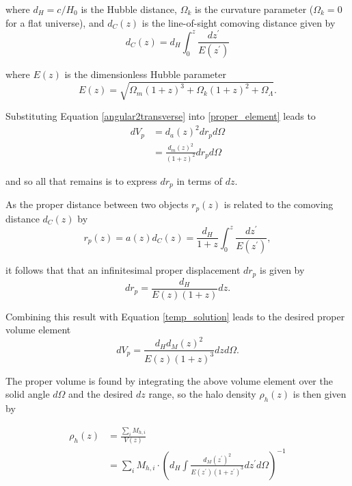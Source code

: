 \documentclass[%
 reprint,
 amsmath,amssymb,
 aps,nofootinbib
]{revtex4-1}
\begin{document}
\noindent where $d_H=c/H_0$ is the Hubble distance, $\Omega_k$ is the curvature parameter ($\Omega_k=0$ for a flat universe), and $d_C(z)$ is the line-of-sight comoving distance given by
\begin{equation}\label{comoving_distance}
d_C(z)=d_H\int_0^z\frac{dz^\prime}{E(z^\prime)}
\end{equation}

\noindent where $E(z)$ is the dimensionless Hubble parameter
\begin{equation}\label{dim_hubble_parameter}
E(z)=\sqrt{\Omega_m(1+z)^3+\Omega_k(1+z)^2+\Omega_\Lambda}.
\end{equation}

\noindent Substituting Equation \eqref{angular2transverse} into \eqref{proper_element} leads to
\begin{align}\label{temp_solution}
dV_p&=d_a(z)^2dr_pd\Omega\nonumber\\
&=\frac{d_m(z)^2}{(1+z)^2}dr_pd\Omega
\end{align}

\noindent and so all that remains is to express $dr_p$ in terms of $dz$.

As the proper distance between two objects $r_p(z)$ is related to the comoving distance $d_C(z)$ by
\begin{equation}\label{physical2comoving}
r_p(z)=a(z)d_C(z)=\frac{d_H}{1+z}\int_0^z\frac{dz^\prime}{E(z^\prime)},
\end{equation}

\noindent it follows that that an infinitesimal proper displacement $dr_p$ is given by
\begin{equation}\label{physical2comoving_inf}
dr_p=\frac{d_H}{E(z)(1+z)}dz.
\end{equation}

\noindent Combining this result with Equation \eqref{temp_solution} leads to the desired proper volume element
\begin{equation}\label{pvolume_element}
dV_p=\frac{d_Hd_M(z)^2}{E(z)(1+z)^3}dzd\Omega.
\end{equation}

The proper volume is found by integrating the above volume element over the solid angle $d\Omega$ and the desired $dz$ range, so the halo density $\rho_h(z)$ is then given by

\begin{align}\label{rho_h}
\rho_h(z)&=\frac{\sum_i M_{h,i}}{V(z)}\nonumber\\
&=\sum_i M_{h,i}\cdot\left(d_H\int\frac{d_M(z^\prime)^2}{E(z^\prime)(1+z^\prime)^3}dz^\prime d\Omega\right)^{-1}
\end{align}
\end{document}
